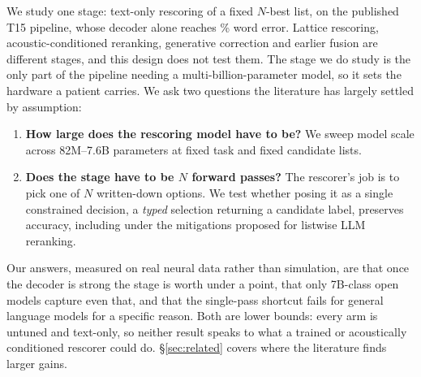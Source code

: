 \documentclass[11pt]{article}
\begin{document}
We study one stage: text-only rescoring of a fixed $N$-best list, on the published T15
pipeline, whose decoder alone reaches \werNone\% word error. Lattice rescoring,
acoustic-conditioned reranking, generative correction and earlier fusion are different
stages, and this design does not test them. The stage we do study is the only part of the
pipeline needing a multi-billion-parameter model, so it sets the hardware a patient
carries. We ask two questions the literature has largely settled by assumption:

\begin{enumerate}\itemsep2pt
\item \textbf{How large does the rescoring model have to be?} We sweep model scale across
  82M--7.6B parameters at fixed task and fixed candidate lists.
\item \textbf{Does the stage have to be $N$ forward passes?} The rescorer's job is to pick
  one of $N$ written-down options. We test whether posing it as a single constrained
  decision, a \emph{typed} selection returning a candidate label, preserves accuracy,
  including under the mitigations proposed for listwise LLM reranking.
\end{enumerate}

Our answers, measured on real neural data rather than simulation, are that once the
decoder is strong the stage is worth under a point, that only 7B-class open models capture
even that, and that the single-pass shortcut fails for general language models for a
specific reason. Both are lower bounds: every arm is untuned and text-only, so neither result
speaks to what a trained or acoustically conditioned rescorer could do.
\S\ref{sec:related} covers where the literature finds larger gains.
\end{document}
